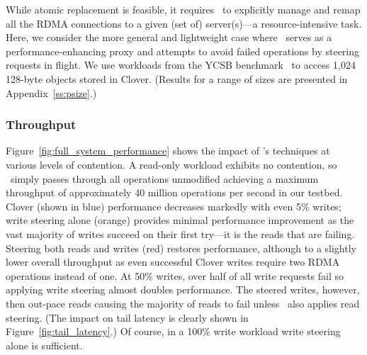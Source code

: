 While atomic replacement is feasible, it requires \sword\ to
explicitly manage and remap all the RDMA connections to a given (set
of) server(s)---a resource-intensive task.  Here, we consider the more
general and lightweight case where \sword\ serves as a
performance-enhancing proxy and attempts to avoid failed operations by
steering requests in flight.  We use workloads from the YCSB
benchmark~\cite{ycsb} to access 1,024 128-byte objects stored in Clover.  (Results for a range of sizes are presented in Appendix~\ref{ss:psize}.)

\subsubsection{Throughput}

Figure~\ref{fig:full_system_performance} shows the impact of \sword's
techniques at various levels of contention.  A read-only workload
exhibits no contention, so \sword\ simply passes through all
operations unmodified achieving a maximum throughput of approximately
40 million operations per second in our testbed.  Clover (shown in
blue) performance decreases markedly with even 5\% writes; write
steering alone (orange) provides minimal performance improvement as
the vast majority of writes succeed on their first try---it is the
reads that are failing.  Steering both reads and writes (red) restores
performance, although to a slightly lower overall throughput as even
successful Clover writes require two RDMA operations instead of one.
%
%
At 50\% writes, over half of all write requests fail so applying write
steering almost doubles performance.  The steered writes, however,
then out-pace reads causing the majority of reads to fail unless
\sword\ also applies read steering.  (The impact on tail latency is
clearly shown in Figure~\ref{fig:tail_latency}.)  Of course, in a
100\% write workload write steering alone is sufficient.
%
%



